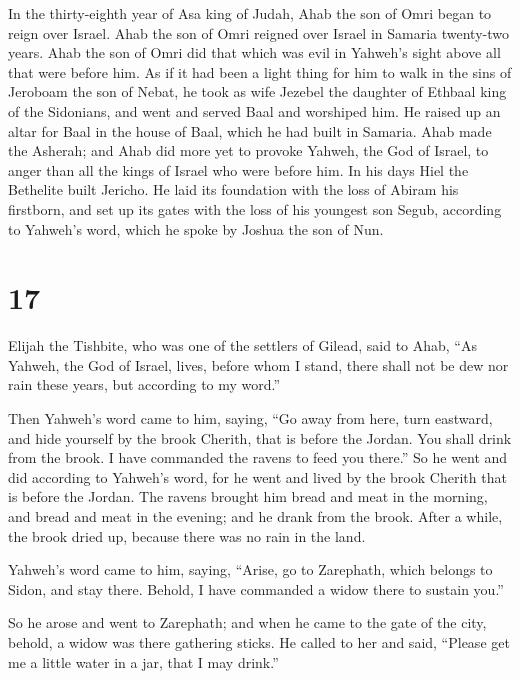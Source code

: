  In the thirty-eighth year of Asa king of Judah, Ahab the
son of Omri began to reign over Israel. Ahab the son of Omri reigned
over Israel in Samaria twenty-two years.  Ahab the son of
Omri did that which was evil in Yahweh's sight above all that were
before him.  As if it had been a light thing for him to
walk in the sins of Jeroboam the son of Nebat, he took as wife Jezebel
the daughter of Ethbaal king of the Sidonians, and went and served Baal
and worshiped him.  He raised up an altar for Baal in the
house of Baal, which he had built in Samaria.  Ahab made
the Asherah; and Ahab did more yet to provoke Yahweh, the God of Israel,
to anger than all the kings of Israel who were before him.
 In his days Hiel the Bethelite built Jericho. He laid
its foundation with the loss of Abiram his firstborn, and set up its
gates with the loss of his youngest son Segub, according to Yahweh's
word, which he spoke by Joshua the son of Nun.

\hypertarget{section-16}{%
\section{17}\label{section-16}}

 Elijah the Tishbite, who was one of the settlers of
Gilead, said to Ahab, ``As Yahweh, the God of Israel, lives, before whom
I stand, there shall not be dew nor rain these years, but according to
my word.''

 Then Yahweh's word came to him, saying, 
``Go away from here, turn eastward, and hide yourself by the brook
Cherith, that is before the Jordan.  You shall drink from
the brook. I have commanded the ravens to feed you there.''
 So he went and did according to Yahweh's word, for he
went and lived by the brook Cherith that is before the Jordan.
 The ravens brought him bread and meat in the morning, and
bread and meat in the evening; and he drank from the brook.
 After a while, the brook dried up, because there was no
rain in the land.

 Yahweh's word came to him, saying, 
``Arise, go to Zarephath, which belongs to Sidon, and stay there.
Behold, I have commanded a widow there to sustain you.''

 So he arose and went to Zarephath; and when he came to
the gate of the city, behold, a widow was there gathering sticks. He
called to her and said, ``Please get me a little water in a jar, that I
may drink.''

